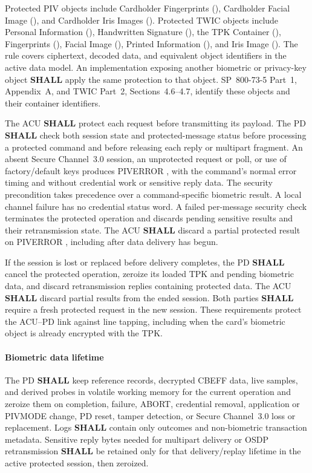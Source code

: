 Protected PIV objects include Cardholder Fingerprints (), Cardholder
Facial Image (), and Cardholder Iris Images (). Protected
TWIC objects include Personal Information (), Handwritten Signature
(), the TPK Container (), Fingerprints (),
Facial Image (), Printed Information (), and Iris Image
(). The rule covers ciphertext, decoded data, and equivalent object
identifiers in the active data model. An implementation exposing another biometric
or privacy-key object \textbf{SHALL} apply the same protection to that object.
SP~800-73-5 Part~1, Appendix~A, and TWIC Part~2, Sections~4.6--4.7, identify these
objects and their container identifiers.

The ACU \textbf{SHALL} protect each request before transmitting its payload.
The PD \textbf{SHALL} check both session state and protected-message status before
processing a protected command and before releasing each reply or multipart
fragment. An absent Secure Channel~3.0 session, an unprotected request or poll,
or use of factory/default keys produces PIVERROR , with the
command's normal error timing and without credential work or sensitive reply data.
The security precondition takes precedence over a command-specific biometric
result. A local channel failure has no credential status word. A failed per-message
security check terminates the protected operation and discards pending sensitive
results and their retransmission state. The ACU \textbf{SHALL} discard a partial
protected result on PIVERROR , including after data delivery has begun.

If the session is lost or replaced before delivery completes, the PD
\textbf{SHALL} cancel the protected operation, zeroize its loaded TPK and pending
biometric data, and discard retransmission replies containing protected data.
The ACU \textbf{SHALL} discard partial results from the ended session. Both
parties \textbf{SHALL} require a fresh protected request in the new session.
These requirements protect the ACU--PD link against line tapping, including
when the card's biometric object is already encrypted with the TPK.

\paragraph{Biometric data lifetime}
The PD \textbf{SHALL} keep reference records, decrypted CBEFF data, live
samples, and derived probes in volatile working memory for the current operation
and zeroize them on completion, failure, ABORT, credential removal, application
or PIVMODE change, PD reset, tamper detection, or Secure Channel~3.0 loss or
replacement. Logs \textbf{SHALL} contain only outcomes and non-biometric
transaction metadata. Sensitive reply bytes needed for multipart delivery or
OSDP retransmission \textbf{SHALL} be retained only for that delivery/replay
lifetime in the active protected session, then zeroized.


